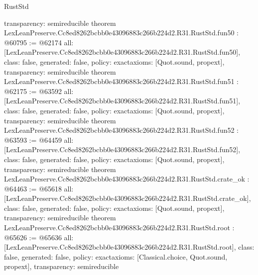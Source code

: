 \begin{lexlean}{RustStd}
\begin{coremodule}
{  transparency: semireducible
}
theorem LexLeanPreserve.Cc8ed8262bcbb0e43096883c266b224d2.R31.RustStd.fun50 : @60795 := @62174 {
  all: [LexLeanPreserve.Cc8ed8262bcbb0e43096883c266b224d2.R31.RustStd.fun50],
  class: false,
  generated: false,
  policy: exact{axioms: [Quot.sound, propext]},
  transparency: semireducible
}
theorem LexLeanPreserve.Cc8ed8262bcbb0e43096883c266b224d2.R31.RustStd.fun51 : @62175 := @63592 {
  all: [LexLeanPreserve.Cc8ed8262bcbb0e43096883c266b224d2.R31.RustStd.fun51],
  class: false,
  generated: false,
  policy: exact{axioms: [Quot.sound, propext]},
  transparency: semireducible
}
theorem LexLeanPreserve.Cc8ed8262bcbb0e43096883c266b224d2.R31.RustStd.fun52 : @63593 := @64459 {
  all: [LexLeanPreserve.Cc8ed8262bcbb0e43096883c266b224d2.R31.RustStd.fun52],
  class: false,
  generated: false,
  policy: exact{axioms: [Quot.sound, propext]},
  transparency: semireducible
}
theorem LexLeanPreserve.Cc8ed8262bcbb0e43096883c266b224d2.R31.RustStd.crate_ok : @64463 := @65618 {
  all: [LexLeanPreserve.Cc8ed8262bcbb0e43096883c266b224d2.R31.RustStd.crate_ok],
  class: false,
  generated: false,
  policy: exact{axioms: [Quot.sound, propext]},
  transparency: semireducible
}
theorem LexLeanPreserve.Cc8ed8262bcbb0e43096883c266b224d2.R31.RustStd.root : @65626 := @65636 {
  all: [LexLeanPreserve.Cc8ed8262bcbb0e43096883c266b224d2.R31.RustStd.root],
  class: false,
  generated: false,
  policy: exact{axioms: [Classical.choice, Quot.sound, propext]},
  transparency: semireducible
}


\end{coremodule}
\end{lexlean}
